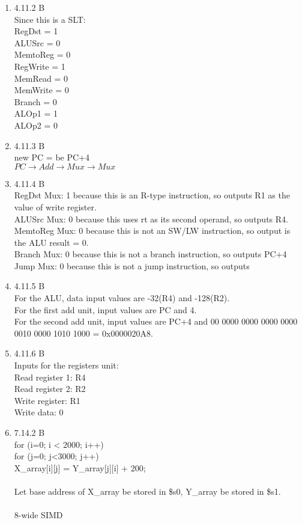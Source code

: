 \documentclass[12pt]{article}
\begin{document}
\begin{enumerate}
\item 4.11.2 B \\
Since this is a SLT: \\ 
RegDst = 1 \\
ALUSrc = 0 \\
MemtoReg = 0 \\
RegWrite = 1 \\
MemRead = 0 \\
MemWrite = 0 \\
Branch = 0 \\
ALOp1 = 1 \\
ALOp2 = 0 
\\
\item 4.11.3 B \\
new PC = be PC+4 \\
$PC \rightarrow Add \rightarrow Mux \rightarrow Mux$
\\

\item 4.11.4 B \\
RegDst Mux: 1 because this is an R-type instruction, so outputs R1 as the value of write register. \\
ALUSrc Mux: 0 because this uses rt as its second operand, so outputs R4. \\
MemtoReg Mux: 0 because this is not an SW/LW instruction, so output is the ALU result = 0. \\
Branch Mux: 0 because this is not a branch instruction, so outputs PC+4\\
Jump Mux: 0 because this is not a jump instruction, so outputs 
\item 4.11.5 B \\
For the ALU, data input values are -32(R4) and -128(R2). \\
For the first add unit, input values are PC and 4. \\
For the second add unit, input values are PC+4 and 00 0000 0000 0000 0000 0010 0000 1010 1000 = 0x0000020A8. \\
\item 4.11.6 B \\
Inputs for the registers unit: \\
Read register 1: R4 \\
Read register 2: R2 \\
Write register: R1 \\
Write data: 0 
\\

\item 7.14.2 B \\
for (i=0; i < 2000; i++) \\
for (j=0; j<3000; j++) \\
X\_array[i][j] = Y\_array[j][i] + 200;\\
\\
Let base address of X\_array be stored in \$s0, Y\_array be stored in \$s1. \\
\\
8-wide SIMD \\


\end{enumerate}
\end{document}
